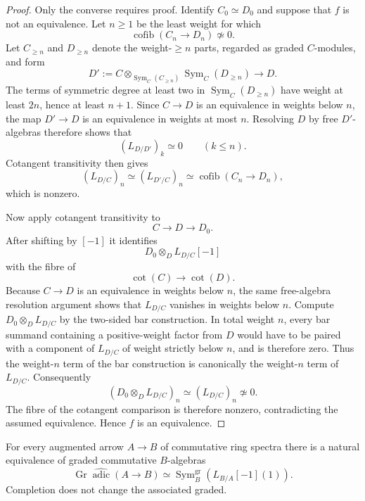 \begin{proof}
Only the converse requires proof.  Identify $C_0\simeq D_0$ and suppose that
$f$ is not an equivalence.  Let $n\geq1$ be the least weight for which
\[
    \operatorname{cofib}(C_n\to D_n)\not\simeq0.
\]
Let $C_{\geq n}$ and $D_{\geq n}$ denote the weight-$\geq n$ parts, regarded
as graded $C$-modules, and form
\[
    D'
    :=
    C
    \otimes_{\operatorname{Sym}_C(C_{\geq n})}
    \operatorname{Sym}_C(D_{\geq n})
    \longrightarrow
    D.
\]
The terms of symmetric degree at least two in
$\operatorname{Sym}_C(D_{\geq n})$ have weight at least $2n$, hence at least
$n+1$.  Since $C\to D$ is an equivalence in weights below $n$, the map
$D'\to D$ is an equivalence in weights at most $n$.  Resolving $D$ by free
$D'$-algebras therefore shows that
\[
    (L_{D/D'})_k\simeq0
    \qquad (k\leq n).
\]
Cotangent transitivity then gives
\[
    (L_{D/C})_n
    \simeq
    (L_{D'/C})_n
    \simeq
    \operatorname{cofib}(C_n\to D_n),
\]
which is nonzero.

Now apply cotangent transitivity to
\[
    C\longrightarrow D\longrightarrow D_0.
\]
After shifting by $[-1]$ it identifies
\[
    D_0\otimes_D L_{D/C}[-1]
\]
with the fibre of
\[
    \operatorname{cot}(C)\longrightarrow\operatorname{cot}(D).
\]
Because $C\to D$ is an equivalence in weights below $n$, the same free-algebra
resolution argument shows that $L_{D/C}$ vanishes in weights below $n$.
Compute $D_0\otimes_D L_{D/C}$ by the two-sided bar construction.  In total
weight $n$, every bar summand containing a positive-weight factor from $D$
would have to be paired with a component of $L_{D/C}$ of weight strictly
below $n$, and is therefore zero.  Thus the weight-$n$ term of the bar
construction is canonically the weight-$n$ term of $L_{D/C}$.  Consequently
\[
    \left(D_0\otimes_D L_{D/C}\right)_n
    \simeq
    (L_{D/C})_n
    \not\simeq0.
\]
The fibre of the cotangent comparison is therefore nonzero, contradicting
the assumed equivalence.  Hence $f$ is an equivalence.
\end{proof}

\begin{theorem}
\label{thm:bnla-adic-associated-graded}
For every augmented arrow $A\to B$ of commutative ring spectra there is a
natural equivalence of graded commutative $B$-algebras
\[
\boxed{
    \operatorname{Gr}
    \widehat{\operatorname{adic}}(A\to B)
    \simeq
    \operatorname{Sym}^{\mathrm{gr}}_B
    \left(L_{B/A}[-1](1)\right).}
\]
Completion does not change the associated graded.
\end{theorem}


